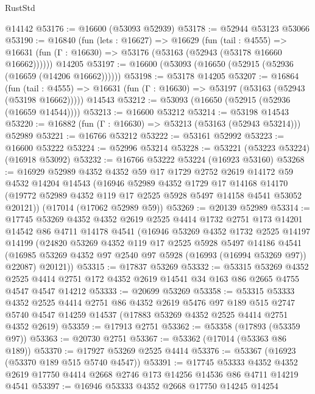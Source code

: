 \begin{lexlean}{RustStd}
\begin{coremodule}
    @14142
@53176 := @16600 (@53093 @52939)
@53178 := @52944 @53123 @53066
@53190 := @16840
    (fun (lets : @16627) =>
    @16629
      (fun (tail : @4555) =>
      @16631 (fun (Γ : @16630) => @53176 (@53163 (@52943 (@53178 @16660 @16662))))))
    @14205
@53197 := @16600 (@53093 (@16650 (@52915 (@52936 (@16659 (@14206 @16662))))))
@53198 := @53178 @14205
@53207 := @16864
    (fun (tail : @4555) => @16631 (fun (Γ : @16630) => @53197 (@53163 (@52943 (@53198 @16662)))))
    @14543
@53212 := @53093 (@16650 (@52915 (@52936 (@16659 @14544))))
@53213 := @16600 @53212
@53214 := @53198 @14543
@53220 := @16882 (fun (Γ : @16630) => @53213 (@53163 (@52943 @53214))) @52989
@53221 := @16766 @53212
@53222 := @53161 @52992
@53223 := @16600 @53222
@53224 := @52996 @53214
@53228 := @53221 (@53223 @53224) (@16918 @53092)
@53232 := @16766 @53222 @53224 (@16923 @53160)
@53268 := @16929
    @52989
    @4352
    @4352
    @59
    @17
    @1729
    @2752
    @2619
    @14172
    @59
    @4532
    @14204
    @14543
    (@16946
      @52989
      @4352
      @1729
      @17
      @14168
      @14170
      (@19772 @52989 @4352 @119 @17 @2525 @5928 @5497 @14158 @4541 @53052 @20121))
    (@17014 (@17062 @52989 @59))
@53269 := @20139 @52989
@53314 := @17745
    @53269
    @4352
    @4352
    @2619
    @2525
    @4414
    @1732
    @2751
    @173
    @14201
    @14542
    @86
    @4711
    @14178
    @4541
    (@16946
      @53269
      @4352
      @1732
      @2525
      @14197
      @14199
      (@24820
        @53269
        @4352
        @119
        @17
        @2525
        @5928
        @5497
        @14186
        @4541
        (@16985 @53269 @4352 @97 @2540 @97 @5928 (@16993 (@16994 @53269 @97)) @22087)
        @20121))
@53315 := @17837 @53269
@53332 := @53315
    @53269
    @4352
    @2525
    @4414
    @2751
    @172
    @4352
    @2619
    @14541
    @34
    @163
    @86
    @2665
    @4755
    @4547
    @4547
    @14212
@53333 := @20699 @53269
@53358 := @53315
    @53333
    @4352
    @2525
    @4414
    @2751
    @86
    @4352
    @2619
    @5476
    @97
    @189
    @515
    @2747
    @5740
    @4547
    @14259
    @14537
    (@17883 @53269 @4352 @2525 @4414 @2751 @4352 @2619)
@53359 := @17913 @2751
@53362 := @53358 (@17893 (@53359 @97))
@53363 := @20730 @2751
@53367 := @53362 (@17014 (@53363 @86 @189))
@53370 := @17927 @53269 @2525 @4414
@53376 := @53367 (@16923 (@53370 @189 @515 @5740 @4547))
@53391 := @17745
    @53333
    @4352
    @4352
    @2619
    @17750
    @4414
    @2668
    @2746
    @173
    @14256
    @14536
    @86
    @4711
    @14219
    @4541
@53397 := @16946 @53333 @4352 @2668 @17750 @14245 @14254

\end{coremodule}
\end{lexlean}
